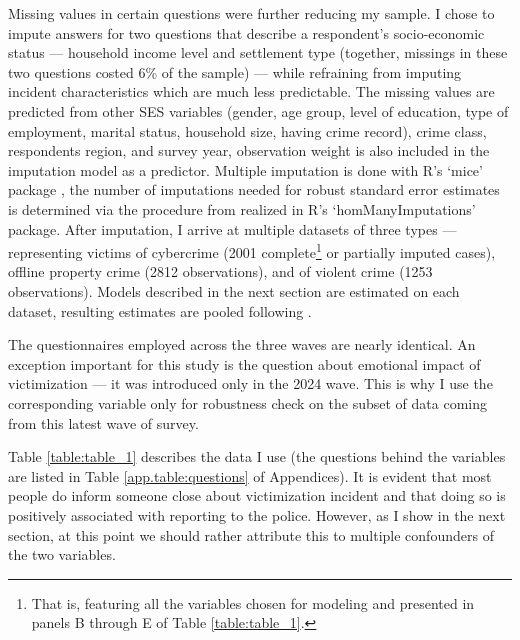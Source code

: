 \documentclass[]{interact}
\theoremstyle{plain}%
\theoremstyle{definition}
\theoremstyle{remark}
\newcommand\citep{\parencite}
\newcommand\citet{\textcite}
\begin{document}
	Missing values in certain questions were further reducing my sample. I chose to impute answers for two questions that describe a respondent's socio-economic status --- household income level and settlement type (together, missings in these two questions costed 6\% of the sample) --- while refraining from imputing incident characteristics which are much less predictable. The missing values are predicted from other SES variables (gender, age group, level of education, type of employment, marital status, household size, having crime record), crime class, respondents region, and survey year, observation weight is also included in the imputation model as a predictor. Multiple imputation is done with R's `mice' package \citep{buuren2011mice}, the number of imputations needed for robust standard error estimates is determined via the procedure from \citet{hippel2020how} realized in R's `homManyImputations' package. After imputation, I arrive at multiple datasets of three types --- representing victims of cybercrime (2001 complete\footnote{That is, featuring all the variables chosen for modeling and presented in panels B through E of Table \ref{table:table_1}.} or partially imputed cases), offline property crime (2812 observations), and of violent crime (1253 observations). Models described in the next section are estimated on each dataset, resulting estimates are pooled following \citet{barnard1999miscellanea}.
	
	The questionnaires employed across the three waves are nearly identical. %
	An exception important for this study is the question about emotional impact of victimization --- it was introduced only in the 2024 wave. This is why I use the corresponding variable only for robustness check on the subset of data coming from this latest wave of survey.
	
	Table \ref{table:table_1} describes the data I use (the questions behind the variables are listed in Table \ref{app.table:questions} of Appendices). 
	It is evident that most people do inform someone close about victimization incident and that doing so is positively associated with reporting to the police. However, as I show in the next section, at this point we should rather attribute this to multiple confounders of the two variables.
	
\end{document}
